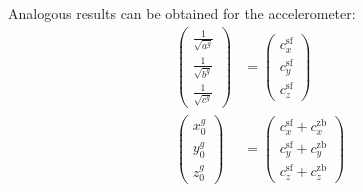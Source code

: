 Analogous results can be obtained for the accelerometer:
\begin{align}
    \begin{pmatrix}
        \frac{1}{\sqrt{a^g}} \\
        \frac{1}{\sqrt{b^g}} \\
        \frac{1}{\sqrt{c^g}} 
    \end{pmatrix}
    &=
    \begin{pmatrix}
        c_x^{\mathrm{sf}} \\
        c_y^{\mathrm{sf}} \\
        c_z^{\mathrm{sf}}
    \end{pmatrix}\\
    \begin{pmatrix}
    x_0^g \\ 
    y_0^g \\ 
    z_0^g
    \end{pmatrix}
    &=
    \begin{pmatrix}
        c_x^{\mathrm{sf}} + c^{\mathrm{zb}}_x\\
        c_y^{\mathrm{sf}} + c^{\mathrm{zb}}_y\\
        c_z^{\mathrm{sf}} + c^{\mathrm{zb}}_z
    \end{pmatrix}
\end{align}